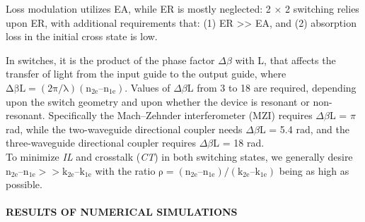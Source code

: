\documentclass[]{article}
\let\oldparagraph\paragraph
\renewcommand{\paragraph}[1]{\oldparagraph{#1}\mbox{}}
\begin{document}
Loss modulation utilizes EA, while ER is mostly neglected: 2 × 2
switching relies upon ER, with additional requirements that: (1) ER
\textgreater{}\textgreater{} EA, and (2) absorption loss in the initial
cross state is low.

In switches, it is the product of the phase factor \(\Delta \beta\) with
L, that affects the transfer of light from the input guide to the output
guide, where
\(\mathrm{\Delta \beta L = (2\pi/\lambda)(n_{2e} – n_{1e})}\). Values of
\(\Delta \beta\)L from 3 to 18 are required, depending upon the switch
geometry and upon whether the device is resonant or non-resonant.
Specifically the Mach--Zehnder interferometer (MZI) requires
\(\Delta \beta\)L = \(\pi\) rad, while the two-waveguide directional
coupler needs \(\Delta \beta\)L = 5.4 rad, and the three-waveguide
directional coupler requires \(\Delta \beta\)L = 18 rad.\\
To minimize \emph{IL} and crosstalk (\emph{CT}) in both switching
states, we generally desire
\(\mathrm{n_{2e} – n_{1e} >> k_{2e} – k_{1e}}\) with the ratio
\(\mathrm{\rho = (n_{2e} – n_{1e})/(k_{2e} – k_{1e})}\) being as high as
possible.

\paragraph{RESULTS OF NUMERICAL
SIMULATIONS}\label{results-of-numerical-simulations}
\end{document}
